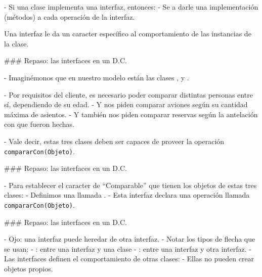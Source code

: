 - Si una clase implementa una interfaz, entonces:
    - Se  a darle una implementación (métodos) a cada operación de
    la interfaz.

\begin{rboxx}{}
Una interfaz le da un caracter específico al comportamiento de las instancias de la clase.
\end{rboxx}

### Repaso: las interfaces en un D.C.


- Imaginémonos que en nuestro modelo están las clases ,  y .

- Por requisitos del cliente, es necesario poder comparar distintas personas entre sí, dependiendo de su edad.
    - Y nos piden comparar aviones según su cantidad máxima de asientos.
    - Y también nos piden comparar reservas según la antelación con que fueron hechas.

- Vale decir, estas tres clases deben ser capaces de proveer la operación \texttt{compararCon(Objeto)}.

### Repaso: las interfaces en un D.C.


- Para establecer el caracter de ``Comparable'' que tienen los objetos de estas tres clases:
    - Definimos una  llamada .
    - Esta interfaz declara una operación llamada \texttt{compararCon(Objeto)}.


### Repaso: las interfaces en un D.C.


\vspace{-1.5em}
\columnsbegin
{}

- Ojo: una interfaz puede heredar de otra interfaz.
- Notar los tipos de flecha que se usan:
    - : entre una interfaz y una clase
    - : entre una interfaz y otra interfaz.
- Las interfaces definen el comportamiento de otras clases:
    - Ellas no pueden crear objetos propios.


